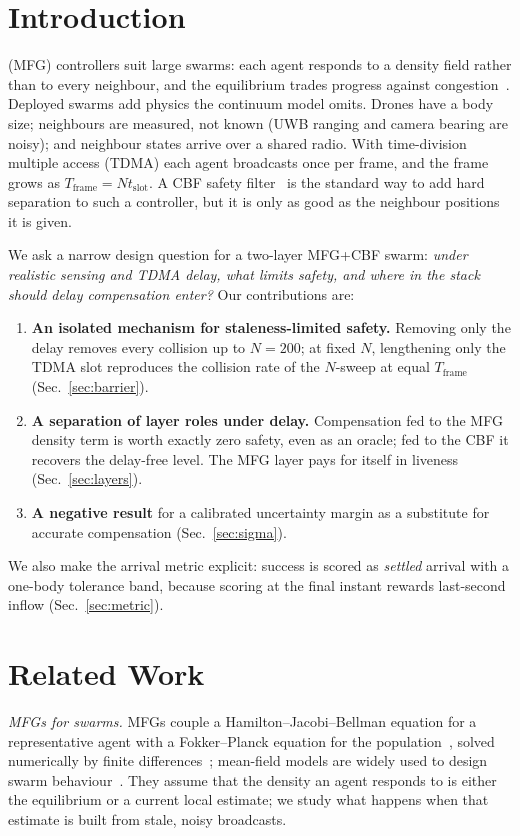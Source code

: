 \documentclass[letterpaper,10pt,journal,twoside]{IEEEtran}
\newcommand{\Tf}{T_{\mathrm{frame}}}
\newcommand{\tslot}{t_{\mathrm{slot}}}
\begin{document}
\section{Introduction}
 (MFG) controllers suit large swarms: each agent responds to a density
field rather than to every neighbour, and the equilibrium trades progress against
congestion~\cite{lasry2007mean,huang2006large,elamvazhuthi2019mean}. Deployed swarms add physics the
continuum model omits. Drones have a body size; neighbours are measured, not known (UWB ranging and camera
bearing are noisy); and neighbour states arrive over a shared radio. With time-division multiple access
(TDMA) each agent broadcasts once per frame, and the frame grows as $\Tf = N\tslot$. A CBF safety
filter~\cite{ames2017cbf,wang2017safety} is the standard way to add hard separation to such a controller,
but it is only as good as the neighbour positions it is given.

We ask a narrow design question for a two-layer MFG+CBF swarm: \emph{under realistic sensing and TDMA delay,
what limits safety, and where in the stack should delay compensation enter?} Our contributions are:
\begin{enumerate}
\item \textbf{An isolated mechanism for staleness-limited safety.} Removing only the delay removes every
  collision up to $N{=}200$; at fixed $N$, lengthening only the TDMA slot reproduces the collision rate of the
  $N$-sweep at equal $\Tf$ (Sec.~\ref{sec:barrier}).
\item \textbf{A separation of layer roles under delay.} Compensation fed to the MFG density term is worth
  exactly zero safety, even as an oracle; fed to the CBF it recovers the delay-free level. The MFG layer pays
  for itself in liveness (Sec.~\ref{sec:layers}).
\item \textbf{A negative result} for a calibrated uncertainty margin as a substitute for accurate
  compensation (Sec.~\ref{sec:sigma}).
\end{enumerate}
We also make the arrival metric explicit: success is scored as \emph{settled} arrival with a one-body
tolerance band, because scoring at the final instant rewards last-second inflow (Sec.~\ref{sec:metric}).

\section{Related Work}
\emph{MFGs for swarms.} MFGs couple a Hamilton--Jacobi--Bellman equation for a representative agent with a
Fokker--Planck equation for the population~\cite{lasry2007mean,huang2006large}, solved numerically by finite
differences~\cite{achdou2010mean}; mean-field models are widely used to design swarm
behaviour~\cite{elamvazhuthi2019mean}. They assume that the density an agent responds to is either the
equilibrium or a current local estimate; we study what happens when that estimate is built from stale, noisy
broadcasts.
\end{document}
